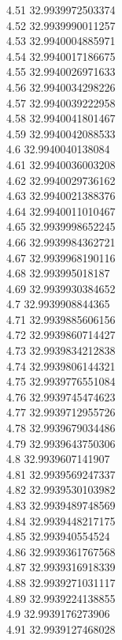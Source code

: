 {4.51	32.9939972503374\\
4.52	32.9939990011257\\
4.53	32.9940004885971\\
4.54	32.9940017186675\\
4.55	32.9940026971633\\
4.56	32.9940034298226\\
4.57	32.9940039222958\\
4.58	32.9940041801467\\
4.59	32.9940042088533\\
4.6	32.9940040138084\\
4.61	32.9940036003208\\
4.62	32.9940029736162\\
4.63	32.9940021388376\\
4.64	32.9940011010467\\
4.65	32.9939998652245\\
4.66	32.9939984362721\\
4.67	32.9939968190116\\
4.68	32.993995018187\\
4.69	32.9939930384652\\
4.7	32.9939908844365\\
4.71	32.9939885606156\\
4.72	32.9939860714427\\
4.73	32.9939834212838\\
4.74	32.9939806144321\\
4.75	32.9939776551084\\
4.76	32.9939745474623\\
4.77	32.9939712955726\\
4.78	32.9939679034486\\
4.79	32.9939643750306\\
4.8	32.9939607141907\\
4.81	32.9939569247337\\
4.82	32.9939530103982\\
4.83	32.9939489748569\\
4.84	32.9939448217175\\
4.85	32.993940554524\\
4.86	32.9939361767568\\
4.87	32.9939316918339\\
4.88	32.9939271031117\\
4.89	32.9939224138855\\
4.9	32.9939176273906\\
4.91	32.9939127468028\\
}
